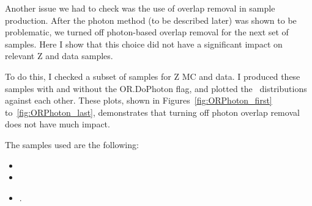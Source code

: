 Another issue we had to check was the use of overlap removal in sample production. After the photon method (to be described later) was shown to be problematic, we turned off photon-based overlap removal for the next set of samples. Here I show that this choice did not have a significant impact on relevant Z and data samples.

To do this, I checked a subset of samples for Z MC and data. I produced these samples with and without the OR.DoPhoton flag, and plotted the \MET\ distributions against each other. These plots, shown in Figures~\ref{fig:ORPhoton_first} to~\ref{fig:ORPhoton_last}, demonstrates that turning off photon overlap removal does not have much impact.

The samples used are the following:

\begin{itemize}
    \item {}
    \item {}
    \item {}.
\end{itemize}

